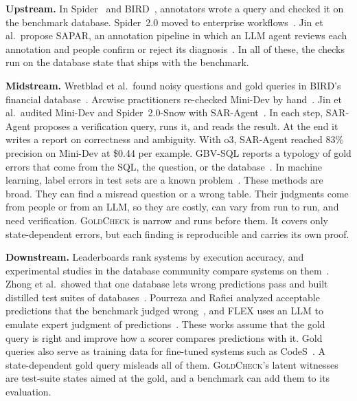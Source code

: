 \documentclass[conference]{IEEEtran}
\newcommand{\sys}{\textsc{GoldCheck}}
\begin{document}
\textbf{Upstream.} In Spider~\cite{yu2018spider} and BIRD~\cite{li2024bird},
annotators wrote a query and checked it on the benchmark database. Spider~2.0
moved to enterprise workflows~\cite{lei2025spider2}. Jin et al.\ propose SAPAR,
an annotation pipeline in which an LLM agent reviews each annotation and people
confirm or reject its diagnosis~\cite{jin2026pervasive}. In all of these, the
checks run on the database state that ships with the benchmark.

\textbf{Midstream.} Wretblad et al.\ found noisy questions and gold queries in
BIRD's financial database~\cite{wretblad2024noise}. Arcwise practitioners
re-checked Mini-Dev by hand~\cite{arcwise2024}. Jin et al.\ audited Mini-Dev and
Spider~2.0-Snow with SAR-Agent~\cite{jin2026pervasive}. In each step, SAR-Agent
proposes a verification query, runs it, and reads the result. At the end it
writes a report on correctness and ambiguity. With o3, SAR-Agent reached 83\%
precision on Mini-Dev at \$0.44 per example. GBV-SQL reports a typology of gold
errors that come from the SQL, the question, or the database~\cite{chen2026gbv}.
In machine learning, label errors in test sets are a known
problem~\cite{northcutt2021pervasive}. These methods are broad. They can find a
misread question or a wrong table. Their judgments come from people or from an
LLM, so they are costly, can vary from run to run, and need verification. \sys{}
is narrow and runs before them. It covers only state-dependent errors, but each
finding is reproducible and carries its own proof.

\textbf{Downstream.} Leaderboards rank systems by execution accuracy, and
experimental studies in the database community compare systems on
them~\cite{kim2020nl2sql,katsogiannis2023survey,li2024dawn,li2024codes}. Zhong
et al.\ showed that one database lets wrong predictions pass and built distilled
test suites of databases~\cite{zhong2020test}. Pourreza and Rafiei analyzed
acceptable predictions that the benchmark judged wrong~\cite{pourreza2023evaluating},
and FLEX uses an LLM to emulate expert judgment of
predictions~\cite{kim2025flex}. These works assume that the gold query is right
and improve how a scorer compares predictions with it. Gold queries also serve as
training data for fine-tuned systems such as CodeS~\cite{li2024codes}. A
state-dependent gold query misleads all of them. \sys{}'s latent witnesses are
test-suite states aimed at the gold, and a benchmark can add them to its
evaluation.
\end{document}
